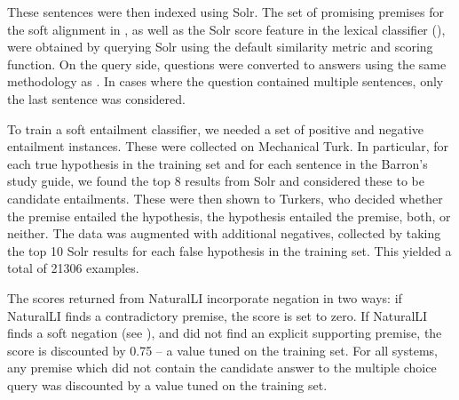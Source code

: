 These sentences were then indexed using Solr.
The set of promising premises for the soft alignment in , as well as
  the Solr score feature in the lexical classifier (),
  were obtained by querying Solr using the default similarity metric and scoring function.
On the query side, questions were converted to answers using the same methodology as
  .
In cases where the question contained multiple sentences, only the last sentence
  was considered.

%
%
To train a soft entailment classifier, we needed a set of positive
  and negative entailment instances.
These were collected on Mechanical Turk. %
In particular, for each true hypothesis in the training set and for each sentence
  in the Barron's study guide, we found the top 8 results from Solr and considered
  these to be candidate entailments.
These were then shown to Turkers, who decided whether the premise entailed the
  hypothesis, the hypothesis entailed the premise, both, or neither.
The data was augmented with additional negatives, collected by taking
  the top 10 Solr results for each false hypothesis in the training set.
This yielded a total of \num{21306} examples.

The scores returned from NaturalLI incorporate negation in two ways:
  if NaturalLI finds a contradictory premise, the score is set to zero.
If NaturalLI finds a soft negation (see ),
  and did not find an explicit supporting premise, the score is discounted
  by 0.75 -- a value tuned on the training set.
For all systems, any premise which did not contain the candidate answer to the
  multiple choice query was discounted by a value tuned on the training
  set.



\def\t#1{\small{#1}}
\def\b#1{\t{\textbf{#1}}}
\def\m#1{\t{\textcolor{darkblue}{#1}}}
\def\c#1{\b{\textcolor{darkblue}{#1}}}
\def\colspaceS{2.0mm}
\def\colspaceM{3.0mm}
\def\colspaceL{5.0mm}

